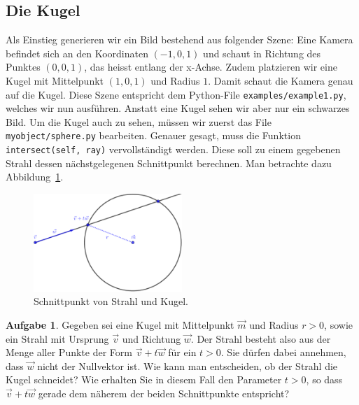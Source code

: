 \documentclass[12pt,a4paper]{article}
\theoremstyle{definition}
\newtheorem{aufgabe}{Aufgabe}
\theoremstyle{definition}
\begin{document}
\subsection{Die Kugel}
Als Einstieg generieren wir ein Bild bestehend aus folgender Szene:
Eine Kamera befindet sich an den Koordinaten $(-1,0,1)$ und schaut in Richtung des Punktes $(0,0,1)$, das heisst entlang der x-Achse.
Zudem platzieren wir eine Kugel mit Mittelpunkt $(1,0,1)$ und Radius $1$.
Damit schaut die Kamera genau auf die Kugel.
Diese Szene entspricht dem Python-File \texttt{examples/example1.py}, welches wir nun ausführen. Anstatt eine Kugel sehen wir aber nur ein schwarzes Bild.
Um die Kugel auch zu sehen, müssen wir zuerst das File \texttt{myobject/sphere.py} bearbeiten.
Genauer gesagt, muss die Funktion \texttt{intersect(self, ray)} vervollständigt werden.
Diese soll zu einem gegebenen Strahl dessen nächstgelegenen Schnittpunkt berechnen.
Man betrachte dazu Abbildung~\ref{fig:sphere_intersect}.
\begin{figure}[ht]
	\centering
	\includegraphics[width=0.5\textwidth]{images/sphere_intersect.pdf}
	\caption{Schnittpunkt von Strahl und Kugel.}
	\label{fig:sphere_intersect}
\end{figure}
\begin{aufgabe}\label{aufg:intersect_theory}
	Gegeben sei eine Kugel mit Mittelpunkt $\vec{m}$ und Radius $r>0$, sowie ein Strahl mit Ursprung $\vec{v}$ und Richtung $\vec{w}$.
	Der Strahl besteht also aus der Menge aller Punkte der Form $\vec{v}+t\vec{w}$ für ein $t>0$.
	Sie dürfen dabei annehmen, dass $\vec{w}$ nicht der Nullvektor ist.
	Wie kann man entscheiden, ob der Strahl die Kugel schneidet?
	Wie erhalten Sie in diesem Fall den Parameter $t>0$, so dass $\vec{v}+t\vec{w}$ gerade dem näherem der beiden Schnittpunkte entspricht?
\end{aufgabe}
\end{document}

